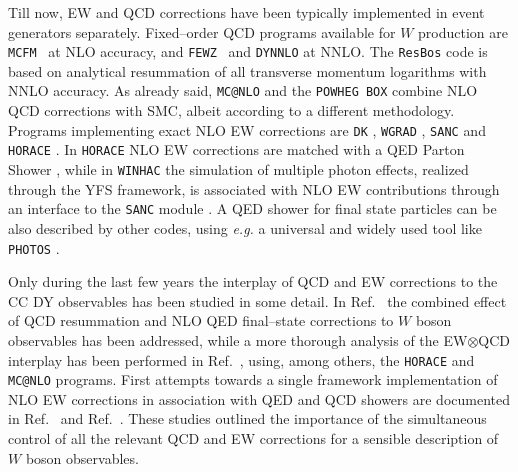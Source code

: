\documentclass[11pt,a4paper]{article}
\newcommand\POWHEGBOX{\texttt{POWHEG BOX}}
\begin{document}
Till now, EW and QCD corrections have been typically implemented in
event generators separately. Fixed--order QCD programs available for $W$ production
are \texttt{MCFM}~\cite{Giele:1993dj,Campbell:2002tg} at NLO accuracy, and 
 \texttt{FEWZ}~\cite{melnikov:2006kv,Gavin:2012kw}  and \texttt{DYNNLO} \cite{Catani:2009sm} 
 at NNLO. The \texttt{ResBos} code  \cite{Balazs:1997xd}
is based on analytical resummation of all transverse momentum 
logarithms with NNLO accuracy.
As already said, \texttt{MC@NLO} \cite{Frixione:2002ik} and the \POWHEGBOX{} \cite{Alioli:2010xd} 
combine NLO QCD corrections with SMC, albeit according to a 
different methodology. Programs implementing exact NLO EW corrections
are \texttt{DK} \cite{Dittmaier:2001ay},  \texttt{WGRAD} \cite{Baur:2004ig}, \texttt{SANC} \cite{Arbuzov:2005dd}
and \texttt{HORACE} \cite{CarloniCalame:2006zq}. In  \texttt{HORACE}  NLO EW 
corrections are matched with a QED Parton Shower \cite{CarloniCalame:2003ux}, 
while in \texttt{WINHAC} \cite{Placzek:2003zg} the simulation
of multiple photon effects, realized through the YFS framework, 
is associated with NLO EW contributions through an interface to the
\texttt{SANC} module \cite{Bardin:2008fn}. A QED shower for final state particles can be also described by other %
codes, using {\it e.g.} a universal and widely used tool like \texttt{PHOTOS} \cite{Golonka:2005pn}. %

Only  during the last few years the interplay of QCD and EW corrections to the CC DY observables 
has been studied in some detail. In Ref.~\cite{Cao:2004yy} the combined effect of QCD resummation and 
NLO QED final--state corrections to $W$ boson observables has been addressed, while a 
more thorough analysis of the EW$\otimes$QCD interplay has been performed in Ref.~\cite{Balossini:2009sa}, using, among others, 
the  \texttt{HORACE} and  \texttt{MC@NLO} programs. 
First attempts towards a single framework implementation of NLO EW corrections 
in association with QED and QCD showers are documented in 
Ref.~\cite{Richardson:2010gz} and Ref.~\cite{Yost:2012mf}.
These studies outlined the importance of the simultaneous control of 
all the relevant QCD and EW corrections for a sensible description of $W$ boson observables.
\end{document}
